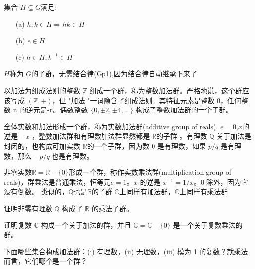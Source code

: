 集合 $H\subseteq G$满足:
\begin{enumerate}
    \item[(a)] $h,k\in H\Rightarrow hk\in H$ 
    \item[(b)] $e\in H$ 
    \item[(c)] $h\in H,h^{-1}\in H$ 
\end{enumerate} 
$H$称为 $G$的子群，无需结合律(Gp1),因为结合律自动继承下来了 
\begin{eg}
    以加法为组成法则的整数 $\mathbb{Z}$ 组成一个群，称为整数加法群。严格地说，这个群应该写成 $(\mathbb{Z},+)$，但 "加法 "一词隐含了组成法则。其特征元素是整数 0，任何整数 n 的逆元是-n。偶数整数 $\{0, \pm 2, \pm 4,...\} $ 构成了整数加法群的一个子群。
\end{eg} 
\begin{eg}
    全体实数和加法形成一个群，称为实数加法群(additive group of reals). $e=0$,$x$的逆是 $-x$ ，整数加法群和有理数加法群显然都是 $\mathbb{R}$的子群 。有理数 $\mathbb{Q}$ 关于加法是封闭的，也构成可加实数 $\mathbb{R}$的一个子群，因为数 0 是有理数，如果 $p /q$ 是有理数，那么 $-p /q$ 也是有理数。
\end{eg}
\begin{eg}
    非零实数$\dot{\mathbb{R}}=\mathbb{R}-\{0\}$形成一个群，称作实数乘法群(multiplication group of reals)，群乘法是普通乘法，恒等元$e=1$。$x$ 的逆是 $x^{-1}=1 /x$。0 除外，因为它没有倒数。
    类似的，$\mathbb{\dot{Q}}$也是$\mathbb{\dot{R}}$的子群
    $\mathbb{C}$上同样有加法群，$\mathbb{\dot{C}}$上同样有乘法群
\end{eg}
\begin{exercise}
    证明非零有理数 $\mathbb{Q}$ 构成了 $\mathbb{R}$ 的乘法子群。
\end{exercise}
\begin{exercise}
    证明复数 $\mathbb{C}$ 构成一个关于加法的群，并且 $\mathbb{C}=\mathbb{C}-\{0\}$ 是一个关于复数乘法的群。
\end{exercise}
\begin{exercise}
    下面哪些集合构成加法群：(i) 有理数，(ii) 无理数，(iii) 模为 1 的复数？就乘法而言，它们哪个是一个群？
\end{exercise}

